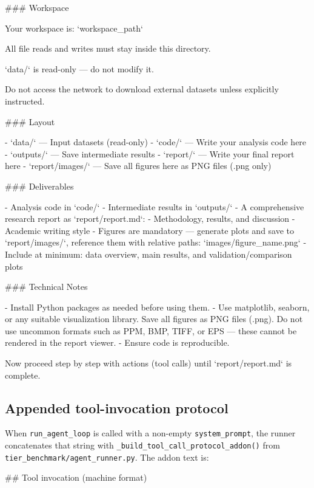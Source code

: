 \begin{AgentDetails}
\begin{PromptBlock}
### Workspace

Your workspace is: `{workspace_path}`

All file reads and writes must stay inside this directory.

`data/` is read-only — do not modify it.

Do not access the network to download external datasets unless explicitly instructed.

### Layout

- `data/` — Input datasets (read-only)
- `code/` — Write your analysis code here
- `outputs/` — Save intermediate results
- `report/` — Write your final report here
- `report/images/` — Save all figures here as PNG files (.png only)

### Deliverables

- Analysis code in `code/`
- Intermediate results in `outputs/`
- A comprehensive research report as `report/report.md`:
  - Methodology, results, and discussion
  - Academic writing style
  - Figures are mandatory — generate plots and save to `report/images/`, reference them with relative paths: `images/figure_name.png`
  - Include at minimum: data overview, main results, and validation/comparison plots

### Technical Notes

- Install Python packages as needed before using them.
- Use matplotlib, seaborn, or any suitable visualization library. Save all figures as PNG files (.png). Do not use uncommon formats such as PPM, BMP, TIFF, or EPS — these cannot be rendered in the report viewer.
- Ensure code is reproducible.

Now proceed step by step with actions (tool calls) until `report/report.md` is complete.
\end{PromptBlock}

\subsection{Appended tool-invocation protocol}
\label{app:tool_invocation_protocol}

When \texttt{run\_agent\_loop} is called with a non-empty \texttt{system\_prompt}, the runner concatenates that string with \texttt{\_build\_tool\_call\_protocol\_addon()} from \texttt{tier\_benchmark/agent\_runner.py}. The addon text is:

\begin{PromptBlock}

## Tool invocation (machine format)


\end{PromptBlock}
\end{AgentDetails}

